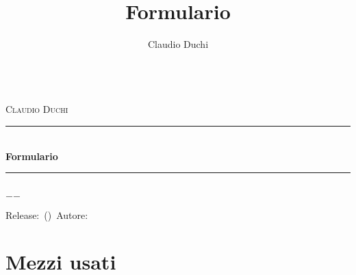 \documentclass[a4paper,oneside]{book}%
\title{Formulario}
\author{Claudio Duchi}
\date{\datetime}
\makeatletter
\theoremstyle{marginbreak}
\theoremstyle{plain}
\theoremstyle{nonumberplain}
\newcommand{\HRule}{\rule{\linewidth}{0.5mm}}
\renewcommand\frontmatter{%
 	\cleardoublepage
 	\@mainmatterfalse
 }
\renewcommand\mainmatter{%
 	\cleardoublepage
 	\@mainmattertrue
 }
\makeatother
\begin{document}
		\frontmatter
		\begin{titlepage}\parindent=0pt
		\begin{center}
					\Lgrandedue\\[1cm]
			\textsc{\LARGE Claudio Duchi}\\[1.2cm]
				\HRule \\[0.4cm]
				{ \huge \bfseries Formulario}\\[0.4cm]
				\HRule \\[1.2cm]
				\vfill
			{\large $-$\DTMnow$-$}	
		\end{center}
		{\centering
	Release:\gitReln\ (\gitAbbrevHash)\ Autore:\gitAuthorName\ 
	\gitCommitterDate \\
}
		\end{titlepage}
	\hypersetup{pageanchor=true}
	\CDcopyright
			\listoftables
			\mainmatter
		
\backmatter	
 \printindex
\appendix
\chapter{Mezzi usati}
\CDMezziUsati
	\twocolumn
\glsaddall
\printglossaries
\onecolumn
\nocite{*}
\printbibliography
\end{document}
